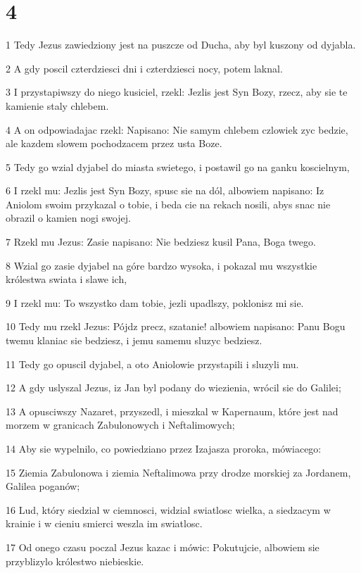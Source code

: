 \chapter{4}

\par 1 Tedy Jezus zawiedziony jest na puszcze od Ducha, aby byl kuszony od dyjabla.
\par 2 A gdy poscil czterdziesci dni i czterdziesci nocy, potem laknal.
\par 3 I przystapiwszy do niego kusiciel, rzekl: Jezlis jest Syn Bozy, rzecz, aby sie te kamienie staly chlebem.
\par 4 A on odpowiadajac rzekl: Napisano: Nie samym chlebem czlowiek zyc bedzie, ale kazdem slowem pochodzacem przez usta Boze.
\par 5 Tedy go wzial dyjabel do miasta swietego, i postawil go na ganku koscielnym,
\par 6 I rzekl mu: Jezlis jest Syn Bozy, spusc sie na dól, albowiem napisano: Iz Aniolom swoim przykazal o tobie, i beda cie na rekach nosili, abys snac nie obrazil o kamien nogi swojej.
\par 7 Rzekl mu Jezus: Zasie napisano: Nie bedziesz kusil Pana, Boga twego.
\par 8 Wzial go zasie dyjabel na góre bardzo wysoka, i pokazal mu wszystkie królestwa swiata i slawe ich,
\par 9 I rzekl mu: To wszystko dam tobie, jezli upadlszy, poklonisz mi sie.
\par 10 Tedy mu rzekl Jezus: Pójdz precz, szatanie! albowiem napisano: Panu Bogu twemu klaniac sie bedziesz, i jemu samemu sluzyc bedziesz.
\par 11 Tedy go opuscil dyjabel, a oto Aniolowie przystapili i sluzyli mu.
\par 12 A gdy uslyszal Jezus, iz Jan byl podany do wiezienia, wrócil sie do Galilei;
\par 13 A opusciwszy Nazaret, przyszedl, i mieszkal w Kapernaum, które jest nad morzem w granicach Zabulonowych i Neftalimowych;
\par 14 Aby sie wypelnilo, co powiedziano przez Izajasza proroka, mówiacego:
\par 15 Ziemia Zabulonowa i ziemia Neftalimowa przy drodze morskiej za Jordanem, Galilea poganów;
\par 16 Lud, który siedzial w ciemnosci, widzial swiatlosc wielka, a siedzacym w krainie i w cieniu smierci weszla im swiatlosc.
\par 17 Od onego czasu poczal Jezus kazac i mówic: Pokutujcie, albowiem sie przyblizylo królestwo niebieskie.
